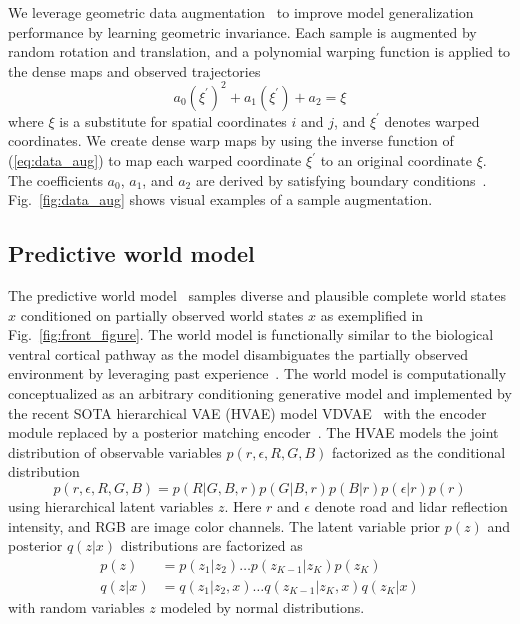\documentclass[letterpaper, 10 pt, conference]{ieeeconf}
\begin{document}
We leverage geometric data augmentation~\cite{karlsson2020dsla} to improve model generalization performance by learning geometric invariance. Each sample is augmented by random rotation and translation, and a polynomial warping function is applied to the dense maps and observed trajectories
\begin{equation}
a_0(\xi^{\prime})^2 + a_1 (\xi^\prime) + a_2 = \xi
\label{eq:data_aug}
\end{equation}
\noindent where $\xi$ is a substitute for spatial coordinates $i$ and $j$, and $\xi^\prime$ denotes warped coordinates. We create dense warp maps by using the inverse function of (\ref{eq:data_aug}) to map each warped coordinate $\xi^\prime$ to an original coordinate $\xi$. The coefficients $a_0$, $a_1$, and $a_2$ are derived by satisfying boundary conditions~\cite{karlsson2020dsla}. Fig.~\ref{fig:data_aug} shows visual examples of a sample augmentation.

\subsection{Predictive world model}
The predictive world model~\cite{karlsson2023pred_wm} samples diverse and plausible complete world states $\hat{x}$ conditioned on partially observed world states $x$ as exemplified in Fig.~\ref{fig:front_figure}. The world model is functionally similar to the biological ventral cortical pathway as the model disambiguates the partially observed environment by leveraging past experience~\cite{milner2008visual_systems}.
The world model is computationally conceptualized as an arbitrary conditioning generative model and implemented by the recent SOTA hierarchical VAE (HVAE) model VDVAE~\cite{child2021vdvae} with the encoder module replaced by a posterior matching encoder~\cite{karlsson2023pred_wm}. The HVAE models the joint distribution of observable variables $p(r, \epsilon, R, G, B)$ factorized as the conditional distribution
\begin{equation}
    p(r, \epsilon, R, G, B) = p(R|G,B,r) p(G|B,r) p(B|r) p(\epsilon|r) p(r)
\end{equation}
\noindent using hierarchical latent variables $z$. Here $r$ and $\epsilon$ denote road and lidar reflection intensity, and RGB are image color channels. The latent variable prior $p(z)$ and posterior $q(z|x)$ distributions are factorized as
\begin{align}
 p(z) &= p(z_1 | z_2) \ldots p(z_{K-1} | z_K) p(z_K) \label{eq:hvae_prior} \\
 q(z|x) &= q(z_1 | z_2, x) \ldots q(z_{K-1} | z_K, x) q(z_K | x)
\end{align}
\noindent with random variables $z$ modeled by normal distributions. 
\end{document}
